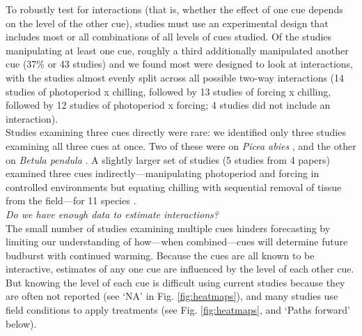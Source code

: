 \documentclass[11pt,letter]{article}
\begin{document}
To robustly test for interactions (that is, whether the effect of one cue depends on the level of the other cue), studies must use an experimental design that includes most or all combinations of all levels of cues studied. Of the studies manipulating at least one cue, roughly a third additionally manipulated another cue (37\% or 43 studies) and we found most were designed to look at interactions, with the studies almost evenly split across all possible two-way interactions (14 studies of photoperiod x chilling, followed by 13 studies of forcing x chilling, followed by 12 studies of photoperiod x forcing; 4 studies did not include an interaction). \\

Studies examining three cues directly were rare: we identified only three studies examining all three cues at once. Two of these were on \emph{Picea abies} \citep{Worrall:1967aa,Sogaard:2008aa}, and the other on \emph{Betula pendula} \citep{Skuterud:1994aa}. A slightly larger set of studies (5 studies from 4 papers) examined three cues indirectly---manipulating photoperiod and forcing in controlled environments but equating chilling with sequential removal of tissue from the field---for 11 species \citep{Schnabel:1987aa,Heide:1993,Partanen:1998aa,Basler:2014aa}. \\

\emph{Do we have enough data to estimate interactions?}\\
The small number of studies examining multiple cues hinders forecasting by limiting our understanding of how---when combined---cues will determine future budburst with continued warming. Because the cues are all known to be interactive, estimates of any one cue are influenced by the level of each other cue. But knowing the level of each cue is difficult using current studies because they are often not reported (see `NA' in Fig. \ref{fig:heatmaps}), and many studies use field conditions to apply treatments (see Fig. \ref{fig:heatmaps}, and `Paths forward' below).\\
\end{document}
